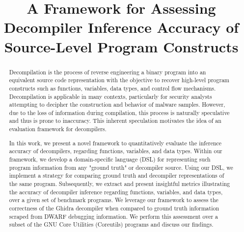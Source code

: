 \documentclass[conference]{IEEEtran}
\begin{document}
\title{A Framework for Assessing Decompiler Inference Accuracy of Source-Level Program Constructs}

\author{
\and
{}
}

\maketitle

\begin{abstract}

Decompilation is the process of reverse engineering a binary program into an equivalent source code representation with the objective to recover high-level program constructs such as functions, variables, data types, and control flow mechanisms. Decompilation is applicable in many contexts, particularly for security analysts attempting to decipher the construction and behavior of malware samples. However, due to the loss of information during compilation, this process is naturally speculative and thus is prone to inaccuracy. This inherent speculation motivates the idea of an evaluation framework for decompilers.

In this work, we present a novel framework to quantitatively evaluate the inference accuracy of decompilers, regarding functions, variables, and data types. Within our framework, we develop a domain-specific language (DSL) for representing such program information from any "ground truth" or decompiler source. Using our DSL, we implement a strategy for comparing ground truth and decompiler representations of the same program. Subsequently, we extract and present insightful metrics illustrating the accuracy of decompiler inference regarding functions, variables, and data types, over a given set of benchmark programs. We leverage our framework to assess the correctness of the Ghidra decompiler when compared to ground truth information scraped from DWARF debugging information. We perform this assessment over a subset of the GNU Core Utilities (Coreutils) programs and discuss our findings.

\end{abstract}
\end{document}
